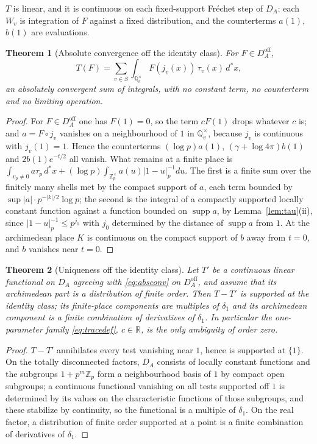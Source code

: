 \documentclass[11pt]{amsart}
\newtheorem{theorem}{Theorem}[section]
\theoremstyle{definition}
\theoremstyle{remark}
\newcommand{\R}{\mathbb R}
\newcommand{\Z}{\mathbb Z}
\newcommand{\Q}{\mathbb Q}
\newcommand{\dstar}{\,d^{*}}
\newcommand{\supp}{\operatorname{supp}}
\newcommand{\DA}{D_A}
\begin{document}
$T$ is linear, and it is continuous on each fixed-support Fr\'echet step of
$\DA$: each $W_v$ is integration of $F$ against a fixed distribution, and the
counterterms $a(1)$, $b(1)$ are evaluations.

\begin{theorem}[Absolute convergence off the identity class]\label{thm:absconv}
For $F\in\DA^{\mathrm{off}}$,
\begin{equation}\label{eq:absconv}
T(F)=\sum_{v\in S}\int_{\Q_v^{\times}}F(j_v(x))\,\tau_v(x)\dstar x ,
\end{equation}
an absolutely convergent sum of integrals, with no constant term, no
counterterm and no limiting operation.
\end{theorem}

\begin{proof}
For $F\in\DA^{\mathrm{off}}$ one has $F(1)=0$, so the term $cF(1)$ drops
whatever $c$ is; and $a=F\circ j_v$ vanishes on a neighbourhood of $1$ in
$\Q_v^{\times}$, because $j_v$ is continuous with $j_v(1)=1$.  Hence the
counterterms $(\log p)a(1)$, $(\gamma+\log4\pi)b(1)$ and $2b(1)e^{-t/2}$ all
vanish.  What remains at a finite place is
$\int_{v_p\ne0}a\tau_p\dstar x+(\log p)\int_{\Z_p^{\times}}a(u)|1-u|_p^{-1}du$.
The first is a finite sum over the finitely many shells met by the compact
support of $a$, each term bounded by $\sup|a|\cdot p^{-|k|/2}\log p$; the
second is the integral of a compactly supported locally constant function
against a function bounded on $\supp a$, by Lemma~\ref{lem:tau}(ii), since
$|1-u|_p^{-1}\le p^{j_0}$ with $j_0$ determined by the distance of $\supp a$
from $1$.  At the archimedean place $K$ is continuous on the compact support
of $b$ away from $t=0$, and $b$ vanishes near $t=0$.
\end{proof}

\begin{theorem}[Uniqueness off the identity class]\label{thm:unique}
Let $T'$ be a continuous linear functional on $\DA$ agreeing with
\eqref{eq:absconv} on $\DA^{\mathrm{off}}$, and assume that its archimedean
part is a distribution of finite order.  Then $T-T'$ is supported at the
identity class; its finite-place components are multiples of $\delta_1$ and its
archimedean component is a finite combination of derivatives of $\delta_1$.  In
particular the one-parameter family \eqref{eq:tracedef}, $c\in\R$, is the only
ambiguity of order zero.
\end{theorem}

\begin{proof}
$T-T'$ annihilates every test vanishing near $1$, hence is supported at
$\{1\}$.  On the totally disconnected factors, $\DA$ consists of locally
constant functions and the subgroups $1+p^{m}\Z_p$ form a neighbourhood basis
of $1$ by compact open subgroups; a continuous functional vanishing on all
tests supported off $1$ is determined by its values on the characteristic
functions of those subgroups, and these stabilize by continuity, so the
functional is a multiple of $\delta_1$.  On the real factor, a distribution of
finite order supported at a point is a finite combination of derivatives of
$\delta_1$.
\end{proof}
\end{document}
